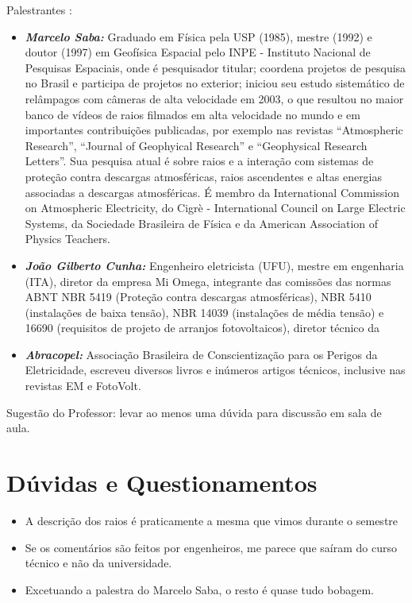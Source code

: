 \documentclass[a4paper, 12pt, onecolumn,singlespacing]{article}
\begin{document}
	Palestrantes : 
	\begin{itemize}
		\item 	\textbf{\textit{Marcelo Saba: }}  Graduado em Física pela USP (1985), mestre (1992) e doutor (1997) em Geofísica Espacial pelo INPE - Instituto Nacional de Pesquisas Espaciais, onde é pesquisador titular; coordena projetos de pesquisa no Brasil e participa de projetos no exterior; iniciou seu estudo sistemático de relâmpagos com câmeras de alta velocidade em 2003, o que resultou no	maior banco de vídeos de raios filmados em alta velocidade no mundo e em importantes contribuições publicadas, por exemplo nas revistas “Atmospheric Research”, “Journal of Geophyical Research” e “Geophysical Research Letters”. Sua pesquisa atual é sobre raios e a interação com sistemas de proteção contra descargas atmosféricas, raios ascendentes e altas energias associadas a descargas atmosféricas. É membro da International Commission on Atmospheric Electricity, do Cigrè - International Council on Large Electric Systems, da Sociedade Brasileira de Física e da American Association of Physics Teachers.
		\item \textbf{\textit{João Gilberto Cunha: }} Engenheiro eletricista (UFU), mestre em engenharia (ITA), diretor da empresa Mi Omega, integrante das comissões das normas ABNT NBR 5419 (Proteção contra descargas atmosféricas), NBR 5410 (instalações de baixa tensão), NBR 14039 (instalações de média tensão) e 16690 (requisitos de projeto de arranjos fotovoltaicos), diretor técnico da
		
		\item \textbf{\textit{Abracopel: }} Associação Brasileira de Conscientização para os Perigos da Eletricidade, escreveu diversos livros e inúmeros artigos técnicos, inclusive nas revistas EM e FotoVolt.
	\end{itemize}
	
	
	Sugestão do Professor: levar ao menos uma dúvida para discussão em sala de aula.
	
	\section{Dúvidas e Questionamentos}
	
	\begin{itemize}
		\item A descrição dos raios é praticamente a mesma que vimos durante o semestre
		\item Se os comentários são feitos por engenheiros, me parece que saíram do curso técnico e não da universidade.
		\item Excetuando a palestra do Marcelo Saba, o resto é quase tudo bobagem.
	\end{itemize}
	
\end{document}
